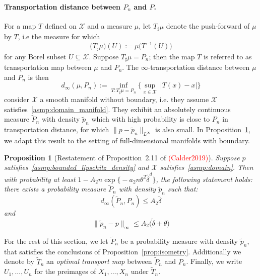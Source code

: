\documentclass{article}
\newcommand{\1}{\mathbf{1}}
\newcommand{\Xset}{\mathcal{X}}
\newcommand{\Leb}{L}
\newcommand{\wt}[1]{\widetilde{#1}}
\theoremstyle{alden}
\theoremstyle{aldenthm}
\newtheorem{proposition}{Proposition}
\theoremstyle{definition}
\theoremstyle{remark}
\begin{document}
\paragraph{Transportation distance between $P_n$ and $P$.}
For a map $T$ defined on $\Xset$ and a measure $\mu$, let $T_{\sharp}\mu$ denote the push-forward of $\mu$ by $T$, i.e the measure for which
\begin{equation*}
\bigl(T_{\sharp}\mu\bigr)(U) := \mu\bigl(T^{-1}(U)\bigr)
\end{equation*}
for any Borel subset $U \subseteq \Xset$. Suppose $T_{\sharp}\mu = P_n$; then the map $T$ is referred to as transportation map between $\mu$ and $P_n$. The  $\infty$-transportation distance between $\mu$ and $P_n$ is then
\begin{equation*}
d_{\infty}(\mu,P_n) := \inf_{T: T_{\sharp} \mu = P_n} \biggl\{\sup_{x \in \Xset}~\bigl|T(x) - x\bigr|\biggr\}
\end{equation*}
\cite{calder2019} consider $\Xset$ a smooth manifold without boundary, i.e. they assume $\Xset$ satisfies~\ref{asmp:domain_manifold}. They exhibit an absolutely continuous measure $\wt{P}_n$ with density $\wt{p}_n$ which with high probability is close to $P_n$ in transportation distance, for which $\|p - \wt{p}_n\|_{\Leb^\infty}$ is also small. In Proposition~\ref{prop:optimal_transport}, we adapt this result to  the setting of full-dimensional manifolds with boundary.  
\begin{proposition}[Restatement of Proposition~2.11 of \textcolor{red}{(Calder2019)}]
	\label{prop:optimal_transport}
	Suppose $p$ satisfies~\ref{asmp:bounded_lipschitz_density} and $\Xset$ satisfies~\ref{asmp:domain}. Then with probability at least $1 - A_2 n \exp\bigl\{-a_2 n\theta^2\wt{\delta}^d\bigr\}$, the following statement holds: there exists a probability measure $\wt{P}_n$ with density $\wt{p}_n$ such that:
	\begin{equation*}
	d_{\infty}(\wt{P}_n, P_n) \leq A_2 \wt{\delta}
	\end{equation*}
	and
	\begin{equation*}
	\|\wt{p}_n - p\|_{\infty} \leq A_2\bigl(\wt{\delta} + \theta\bigr)
	\end{equation*}
\end{proposition}
 For the rest of this section, we let $\wt{P}_n$ be a probability measure with density $\wt{p}_n$, that satisfies the conclusions of Proposition~\ref{prop:isometry}. Additionally we denote by $\wt{T}_n$ an \emph{optimal transport map} between $\wt{P}_n$ and $P_n$. Finally, we write $U_1,\ldots,U_n$ for the preimages of $X_1,\ldots,X_n$ under $\wt{T}_n$. 
\end{document}
